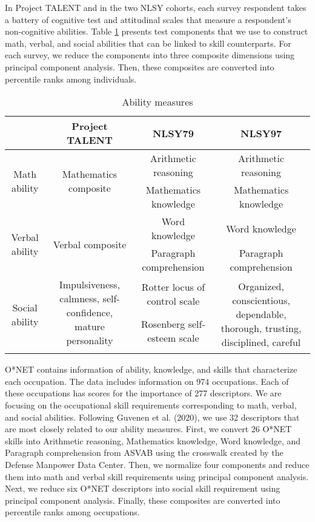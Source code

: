 \documentclass{article}
\begin{document}
In Project TALENT and in the two NLSY cohorts, each survey respondent takes a battery of cognitive test and attitudinal scales that measure a respondent's non-cognitive abilities. Table \ref{tab:ability} presents test components that we use to construct math, verbal, and social abilities that can be linked to skill counterparts. For each survey, we reduce the components into three composite dimensions using principal component analysis. Then, these composites are converted into percentile ranks among individuals.

\begin{table}[ht!]
	\begin{center}
		\begin{tabular}{|| c | c | c | c |} 
			\hline
			 & Project TALENT & NLSY79 & NLSY97\\ [0.5ex] 
			\hline\hline
			\multirow{2}{2.1cm}{\centering Math ability} & \multirow{2}{3.9cm}{\centering Mathematics composite} & Arithmetic reasoning & Arithmetic reasoning \\ 
			 & & Mathematics knowledge & Mathematics knowledge \\ 
			 \hline
			\multirow{2}{2.1cm}{\centering Verbal ability} & \multirow{2}{3.9cm}{\centering Verbal composite} & Word knowledge & Word knowledge \\ 
			 &  & Paragraph comprehension & Paragraph comprehension \\ 
			 \hline
			\multirow{3}{2.1cm}{\centering Social ability} & \multirow{2}{3.9cm}{\centering Impulsiveness, calmness, self-confidence, mature personality} & Rotter locus of control scale & \multirow{3}{5cm}{\centering Organized, conscientious, dependable, thorough, trusting, disciplined, careful} \\ 
			 & & Rosenberg self-esteem scale &   \\
			 &  &  &  \\
			\hline
		\end{tabular}
		    \caption{Ability measures}\label{tab:ability}
	\end{center}
\end{table}

O*NET contains information of ability, knowledge, and skills that characterize each occupation. The data includes information on 974 occupations. Each of these occupations has scores for the importance of 277 descriptors. We are focusing on the occupational skill requirements corresponding to math, verbal, and social abilities. Following Guvenen et al. (2020), we use 32 descriptors that are most closely related to our ability measures. First, we convert 26 O*NET skills into Arithmetic reasoning, Mathematics knowledge, Word knowledge, and Paragraph comprehension from ASVAB using the crosswalk created by the Defense Manpower Data Center. Then, we normalize four components and reduce them into math and verbal skill requirements using principal component analysis. Next, we reduce six O*NET descriptors into social skill requirement using principal component analysis. Finally, these composites are converted into percentile ranks among occupations.
\end{document}
